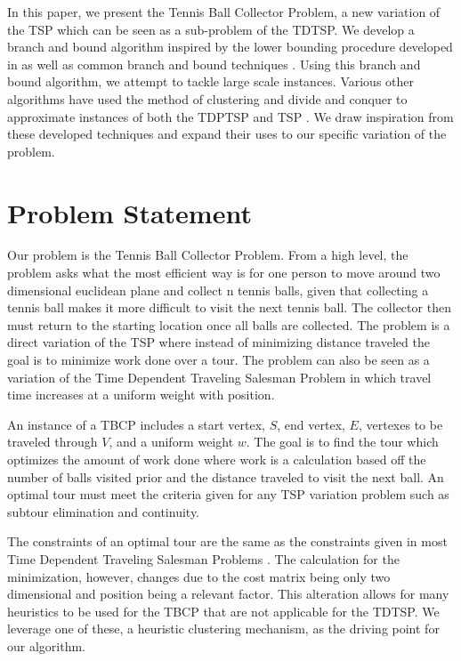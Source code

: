 \documentclass[sigconf, anonymous, pdftex]{acmart}
\begin{document}
In this paper, we present the Tennis Ball Collector Problem, a new variation of the TSP which can be seen as a sub-problem of the TDTSP. We develop a branch and bound algorithm inspired by the lower bounding procedure developed in \cite{bbTardyMachine} as well as common branch and bound techniques \cite{branch&boundBasics}. Using this branch and bound algorithm, we attempt to tackle large scale instances. Various other algorithms have used the method of clustering and divide and conquer to approximate instances of both the TDPTSP and TSP \cite{dcClusteringMillionTSP}\cite{GAclusterTSP}\cite{tspLargeClustering}. We draw inspiration from these developed techniques and expand their uses to our specific variation of the problem.


\section{Problem Statement}

Our problem is the Tennis Ball Collector Problem. From a high level, the problem asks what the most efficient way is for one person to move around two dimensional euclidean plane and collect n tennis balls, given that collecting a tennis ball makes it more difficult to visit the next tennis ball. The collector then must return to the starting location once all balls are collected. The problem is a direct variation of the TSP where instead of minimizing distance traveled the goal is to minimize work done over a tour. The problem can also be seen as a variation of the Time Dependent Traveling Salesman Problem in which travel time increases at a uniform weight with position.

An instance of a TBCP includes a start vertex, $S$, end vertex, $E$, vertexes to be traveled through $V$, and a uniform weight $w$. The goal is to find the tour which optimizes the amount of work done where work is a calculation based off the number of balls visited prior and the distance traveled to visit the next ball. An optimal tour must meet the criteria given for any TSP variation problem such as subtour elimination and continuity.

The constraints of an optimal tour are the same as the constraints given in most Time Dependent Traveling Salesman Problems \cite{tdtspDefinition}. The calculation for the minimization, however, changes due to the cost matrix being only two dimensional and position being a relevant factor. This alteration allows for many heuristics to be used for the TBCP that are not applicable for the TDTSP. We leverage one of these, a heuristic clustering mechanism, as the driving point for our algorithm.
\end{document}

